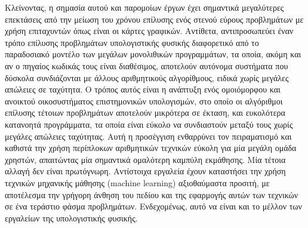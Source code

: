 Κλείνοντας, η σημασία αυτού και παρομοίων έργων έχει σημαντικά μεγαλύτερες επεκτάσεις από την μείωση του χρόνου επίλυσης ενός στενού εύρους προβλημάτων με χρήση επιταχυντών όπως είναι οι κάρτες γραφικών.
Αντίθετα, αντιπροσωπεύει έναν τρόπο επίλυσης προβλημάτων υπολογιστικής φυσικής διαφορετικό από το παραδοσιακό μοντέλο των μεγάλων μονολιθικών προγραμμάτων, τα οποία, ακόμη και αν ο πηγαίος κωδικάς τους είναι διαθέσιμος, αποτελούν αυτόνομα συστήματα που δύσκολα συνδιάζονται με άλλους αριθμητικούς αλγορίθμους, ειδικά χωρίς μεγάλες απώλειες σε ταχύτητα.
Ο τρόπος αυτός είναι η ανάπτυξη ενός ομοιόμορφου και ανοικτού οικοσυστήματος επιστημονικών υπολογισμών, στο οποίο οι αλγόριθμοι επίλυσης τέτοιων προβλημάτων αποτελούν μικρότερα σε έκταση, και ευκολότερα κατανοητά προγράμματα, τα οποία είναι εύκολο να συνδιαστούν μεταξύ τους χωρίς μεγάλες απώλειες ταχύτητας.
Αυτή η προσέγγιση ενθαρρύνει τον πειραματισμό και καθιστά την χρήση περίπλοκων αριθμητικών τεχνικών εύκολη για μία μεγάλη ομάδα χρηστών, απαιτώντας μία σημαντικά ομαλότερη καμπύλη εκμάθησης.
Μία τέτοια αλλαγή δεν είναι πρωτόγνωρη.
Αντίστοιχα εργαλεία έχουν καταστήσει την χρήση τεχνικών μηχανικής μάθησης (machine learning) αξιοθαύμαστα προσιτή, με αποτέλεσμα την γρήγορη άνθηση του πεδίου και της εφαρμογής αυτών των τεχνικών σε ένα τεράστιο φάσμα προβλημάτων.
Ενδεχομένως, αυτό να είναι και το μέλλον των εργαλείων της υπολογιστικής φυσικής.



